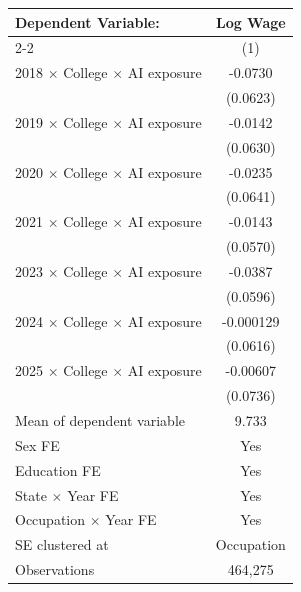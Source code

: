 \def\sym#1{\ifmmode^{#1}\else\(^{#1}\)\fi}
\begin{tabular}{l*{1}{c}}
\toprule
Dependent Variable: & \multicolumn{1}{c}{Log Wage} \\
\cmidrule(lr){2-2}
 & (1) \\
\midrule
2018 $\times$ College $\times$ AI exposure&     -0.0730   \\
            &    (0.0623)   \\
2019 $\times$ College $\times$ AI exposure&     -0.0142   \\
            &    (0.0630)   \\
2020 $\times$ College $\times$ AI exposure&     -0.0235   \\
            &    (0.0641)   \\
2021 $\times$ College $\times$ AI exposure&     -0.0143   \\
            &    (0.0570)   \\
2023 $\times$ College $\times$ AI exposure&     -0.0387   \\
            &    (0.0596)   \\
2024 $\times$ College $\times$ AI exposure&   -0.000129   \\
            &    (0.0616)   \\
2025 $\times$ College $\times$ AI exposure&    -0.00607   \\
            &    (0.0736)   \\
\midrule
Mean of dependent variable&       9.733   \\
Sex FE      &         Yes   \\
Education FE&         Yes   \\
State $\times$ Year FE&         Yes   \\
Occupation $\times$ Year FE&         Yes   \\
SE clustered at&  Occupation   \\
Observations&     464,275   \\
\bottomrule
\end{tabular}
